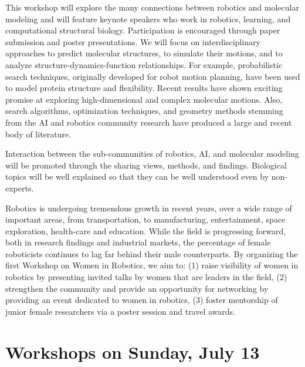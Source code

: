 \begin{spacing}{1.0}
{This workshop will explore the many connections between robotics and molecular modeling and will feature keynote speakers who work in robotics, learning, and computational structural biology. Participation is encouraged through paper submission and poster presentations. We will focus on interdisciplinary approaches to predict molecular structures, to simulate their motions, and to analyze structure-dynamics-function relationships. For example, probabilistic search techniques, originally developed for robot motion planning, have been used to model protein structure and flexibility. Recent results have shown exciting promise at exploring high-dimensional and complex molecular motions. Also, search algorithms, optimization techniques, and geometry methods stemming from the AI and robotics community research have produced a large and recent body of literature. 

Interaction between the sub-communities of robotics, AI, and molecular modeling will be promoted through the sharing views, methods, and findings. Biological topics will be well explained so that they can be well understood even by non-experts.
}



{
Robotics is undergoing tremendous growth in recent years, over a wide range of important areas, from transportation, to manufacturing, entertainment, space exploration, health-care and education. While the field is progressing forward, both in research findings and industrial markets, the percentage of female roboticists continues to lag far behind their male counterparts. By organizing the first Workshop on Women in Robotics, we aim to: (1) raise visibility of women in robotics by presenting invited talks by women that are leaders in the field, (2) strengthen the community and provide an opportunity for networking by providing an event dedicated to women in robotics, (3) foster mentorship of junior female researchers via a poster session and travel awards.
}


\chapter{Workshops on Sunday, July 13}

\vspace*{-2.0cm}



\end{spacing}
